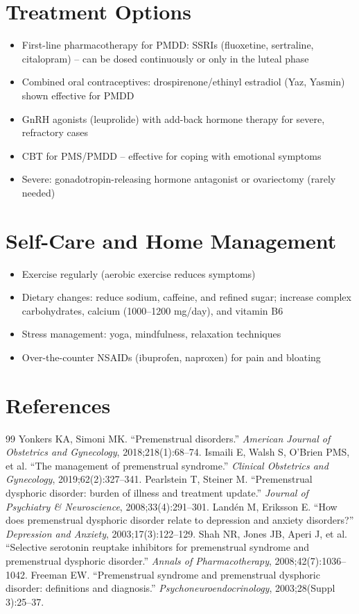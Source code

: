 \section*{Treatment Options}
\begin{itemize}
  \item First-line pharmacotherapy for PMDD: SSRIs (fluoxetine, sertraline, citalopram) -- can be dosed continuously or only in the luteal phase
  \item Combined oral contraceptives: drospirenone/ethinyl estradiol (Yaz, Yasmin) shown effective for PMDD
  \item GnRH agonists (leuprolide) with add-back hormone therapy for severe, refractory cases
  \item CBT for PMS/PMDD -- effective for coping with emotional symptoms
  \item Severe: gonadotropin-releasing hormone antagonist or ovariectomy (rarely needed)
\end{itemize}

\section*{Self-Care and Home Management}
\begin{itemize}
  \item Exercise regularly (aerobic exercise reduces symptoms)
  \item Dietary changes: reduce sodium, caffeine, and refined sugar; increase complex carbohydrates, calcium (1000--1200 mg/day), and vitamin B6
  \item Stress management: yoga, mindfulness, relaxation techniques
  \item Over-the-counter NSAIDs (ibuprofen, naproxen) for pain and bloating
\end{itemize}

\section*{References}
\begin{thebibliography}{99}
 Yonkers KA, Simoni MK. ``Premenstrual disorders.'' \textit{American Journal of Obstetrics and Gynecology}, 2018;218(1):68--74.
 Ismaili E, Walsh S, O'Brien PMS, et al. ``The management of premenstrual syndrome.'' \textit{Clinical Obstetrics and Gynecology}, 2019;62(2):327--341.
 Pearlstein T, Steiner M. ``Premenstrual dysphoric disorder: burden of illness and treatment update.'' \textit{Journal of Psychiatry \& Neuroscience}, 2008;33(4):291--301.
 Land\'en M, Eriksson E. ``How does premenstrual dysphoric disorder relate to depression and anxiety disorders?'' \textit{Depression and Anxiety}, 2003;17(3):122--129.
 Shah NR, Jones JB, Aperi J, et al. ``Selective serotonin reuptake inhibitors for premenstrual syndrome and premenstrual dysphoric disorder.'' \textit{Annals of Pharmacotherapy}, 2008;42(7):1036--1042.
 Freeman EW. ``Premenstrual syndrome and premenstrual dysphoric disorder: definitions and diagnosis.'' \textit{Psychoneuroendocrinology}, 2003;28(Suppl 3):25--37.

\end{thebibliography}
